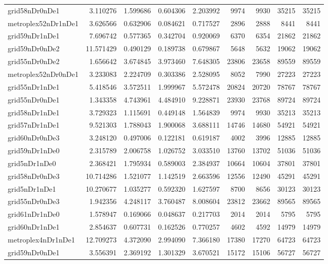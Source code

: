 \begin{longtable}{|l|r|r|r|r|r|r|r|r|}
grid58nDr0nDe1 & 3.110276 & 1.599686 & 0.604306 & 2.203992 & 9974 & 9930 & 35215 & 35215 \\
metroplex52nDr1nDe1 & 3.626566 & 0.632906 & 0.084621 & 0.717527 & 2896 & 2888 & 8441 & 8441 \\
grid59nDr1nDe1 & 7.696742 & 0.577365 & 0.342704 & 0.920069 & 6370 & 6354 & 21862 & 21862 \\
grid59nDr0nDe2 & 11.571429 & 0.490129 & 0.189738 & 0.679867 & 5648 & 5632 & 19062 & 19062 \\
grid55nDr0nDe2 & 1.656642 & 3.674845 & 3.973460 & 7.648305 & 23806 & 23658 & 89559 & 89559 \\
metroplex52nDr0nDe1 & 3.233083 & 2.224709 & 0.303386 & 2.528095 & 8052 & 7990 & 27223 & 27223 \\
grid55nDr1nDe1 & 5.418546 & 3.572511 & 1.999967 & 5.572478 & 20824 & 20720 & 78767 & 78767 \\
grid55nDr0nDe1 & 1.343358 & 4.743961 & 4.484910 & 9.228871 & 23930 & 23768 & 89724 & 89724 \\
grid58nDr1nDe1 & 3.729323 & 1.115691 & 0.449148 & 1.564839 & 9974 & 9930 & 35213 & 35213 \\
grid57nDr1nDe1 & 9.521303 & 1.788043 & 1.900068 & 3.688111 & 14746 & 14680 & 54921 & 54921 \\
grid60nDr0nDe3 & 3.248120 & 0.497006 & 0.122181 & 0.619187 & 4002 & 3996 & 12885 & 12885 \\
grid59nDr1nDe0 & 2.315789 & 2.006758 & 1.026752 & 3.033510 & 13760 & 13702 & 51036 & 51036 \\
grid5nDr1nDe0 & 2.368421 & 1.795934 & 0.589003 & 2.384937 & 10664 & 10604 & 37801 & 37801 \\
grid58nDr0nDe3 & 10.714286 & 1.521077 & 1.142519 & 2.663596 & 12556 & 12490 & 45291 & 45291 \\
grid5nDr1nDe1 & 10.270677 & 1.035277 & 0.592320 & 1.627597 & 8700 & 8656 & 30123 & 30123 \\
grid55nDr0nDe3 & 1.942356 & 4.248117 & 3.760487 & 8.008604 & 23812 & 23662 & 89565 & 89565 \\
grid61nDr1nDe0 & 1.578947 & 0.169066 & 0.048637 & 0.217703 & 2014 & 2014 & 5795 & 5795 \\
grid60nDr1nDe1 & 2.854637 & 0.607731 & 0.162526 & 0.770257 & 4602 & 4592 & 14979 & 14979 \\
metroplex4nDr1nDe1 & 12.709273 & 4.372090 & 2.994090 & 7.366180 & 17380 & 17270 & 64723 & 64723 \\
grid59nDr0nDe1 & 3.556391 & 2.369192 & 1.301329 & 3.670521 & 15172 & 15106 & 56727 & 56727 \\

\end{longtable}
